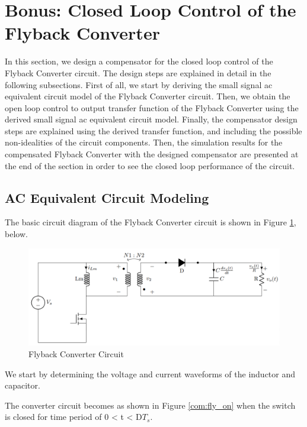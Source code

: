 \section{Bonus: Closed Loop Control of the Flyback Converter}

In this section, we design a compensator for the closed loop control of the Flyback Converter circuit. The design steps are explained in detail in the following subsections. First of all, we start by deriving the small signal ac equivalent circuit model of the Flyback Converter circuit. Then, we obtain the open loop control to output transfer function of the Flyback Converter using the derived small signal ac equivalent circuit model. Finally, the compensator design steps are explained using the derived transfer function, and including the possible non-idealities of the circuit components. Then, the simulation results for the compensated Flyback Converter with the designed compensator are presented at the end of the section in order to see the closed loop performance of the circuit.

\subsection{AC Equivalent Circuit Modeling}

The basic circuit diagram of the Flyback Converter circuit is shown in Figure \ref{com:fly1}, below.

\begin{figure}[H]
\begin{center}
\includegraphics[width=1\textwidth]{Compensator/flyback1.png}
\caption{Flyback Converter Circuit}
\label{com:fly1}
\end{center}
\end{figure}

We start by determining the voltage and current waveforms of the inductor and capacitor.

The converter circuit becomes as shown in Figure \ref{com:fly_on} when the switch is closed for time period of 0 < t < D$T_s$.

